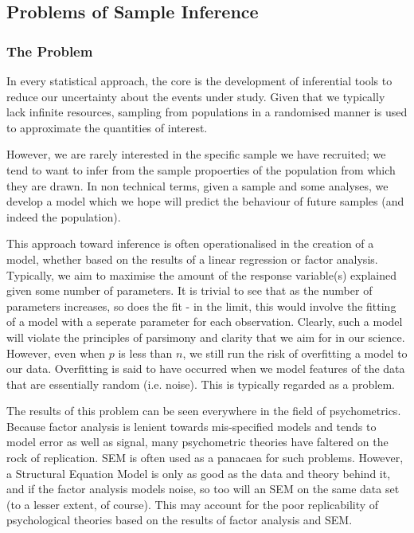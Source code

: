 \subsection{Problems of Sample Inference}
\label{sec:probl-sample-infer}
\subsubsection{The Problem}

In every statistical approach, the core is the development of inferential tools to reduce our uncertainty about the events under study\cite{gelman2010philosophy}. Given that we typically lack infinite resources, sampling from populations in a randomised manner is used to approximate the quantities of interest\cite{venables2002modern}. 

However, we are rarely interested in the specific sample we have recruited; we tend to want to infer from the sample propoerties of the population from which they are drawn. In non technical terms, given a sample and some analyses, we develop a model which we hope will predict the behaviour of future samples (and indeed the population). 

This approach toward inference is often operationalised in the creation of a model, whether based on the results of a linear regression or factor analysis. Typically, we aim to maximise the amount of the response variable(s) explained given some number of parameters. It is trivial to see that as the number of parameters increases, so does the fit - in the limit, this would involve the fitting of a model with a seperate parameter for each observation. Clearly, such a model will violate the principles of parsimony and clarity that we aim for in our science. However, even when $p$ is less than $n$, we still run the risk of overfitting a model to our data. Overfitting is said to have occurred when we model features of the data that are essentially random (i.e. noise)\cite{friedman2009elements}. This is typically regarded as a problem. 

The results of this problem can be seen everywhere in the field of psychometrics. Because factor analysis is lenient towards mis-specified models and tends to model error as well as signal, many psychometric theories have faltered on the rock of replication\cite{fabrigar1999evaluating}. SEM is often used as a panacaea for such problems. However, a Structural Equation Model is only as good as the data and theory behind it, and if the factor analysis models noise, so too will an SEM on the same data set (to a lesser extent, of course). This may account for the poor replicability of psychological theories based on the results of factor analysis and SEM. 

